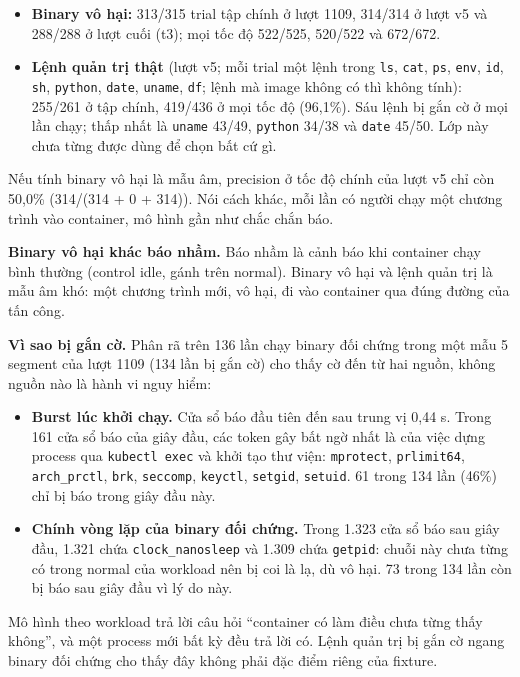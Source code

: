 \begin{itemize}
\tightlist
\item
  \textbf{Binary vô hại:} 313/315 trial tập chính ở lượt 1109, 314/314 ở lượt v5 và 288/288 ở lượt cuối (t3); mọi tốc độ 522/525, 520/522 và 672/672.
\item
  \textbf{Lệnh quản trị thật} (lượt v5; mỗi trial một lệnh trong \texttt{ls}, \texttt{cat}, \texttt{ps}, \texttt{env}, \texttt{id}, \texttt{sh}, \texttt{python}, \texttt{date}, \texttt{uname}, \texttt{df}; lệnh mà image không có thì không tính): 255/261 ở tập chính, 419/436 ở mọi tốc độ (96,1\%). Sáu lệnh bị gắn cờ ở mọi lần chạy; thấp nhất là \texttt{uname} 43/49, \texttt{python} 34/38 và \texttt{date} 45/50. Lớp này chưa từng được dùng để chọn bất cứ gì.
\end{itemize}

Nếu tính binary vô hại là mẫu âm, precision ở tốc độ chính của lượt v5 chỉ còn 50,0\% (314/(314 + 0 + 314)). Nói cách khác, mỗi lần có người chạy một chương trình vào container, mô hình gần như chắc chắn báo.

\textbf{Binary vô hại khác báo nhầm.} Báo nhầm là cảnh báo khi container chạy bình thường (control idle, gánh trên normal). Binary vô hại và lệnh quản trị là mẫu âm khó: một chương trình mới, vô hại, đi vào container qua đúng đường của tấn công.

\textbf{Vì sao bị gắn cờ.} Phân rã trên 136 lần chạy binary đối chứng trong một mẫu 5 segment của lượt 1109 (134 lần bị gắn cờ) cho thấy cờ đến từ hai nguồn, không nguồn nào là hành vi nguy hiểm:

\begin{itemize}
\tightlist
\item
  \textbf{Burst lúc khởi chạy.} Cửa sổ báo đầu tiên đến sau trung vị 0,44 s. Trong 161 cửa sổ báo của giây đầu, các token gây bất ngờ nhất là của việc dựng process qua \texttt{kubectl exec} và khởi tạo thư viện: \texttt{mprotect}, \texttt{prlimit64}, \texttt{arch\_prctl}, \texttt{brk}, \texttt{seccomp}, \texttt{keyctl}, \texttt{setgid}, \texttt{setuid}. 61 trong 134 lần (46\%) chỉ bị báo trong giây đầu này.
\item
  \textbf{Chính vòng lặp của binary đối chứng.} Trong 1.323 cửa sổ báo sau giây đầu, 1.321 chứa \texttt{clock\_nanosleep} và 1.309 chứa \texttt{getpid}: chuỗi này chưa từng có trong normal của workload nên bị coi là lạ, dù vô hại. 73 trong 134 lần còn bị báo sau giây đầu vì lý do này.
\end{itemize}

Mô hình theo workload trả lời câu hỏi ``container có làm điều chưa từng thấy không'', và một process mới bất kỳ đều trả lời có. Lệnh quản trị bị gắn cờ ngang binary đối chứng cho thấy đây không phải đặc điểm riêng của fixture.

